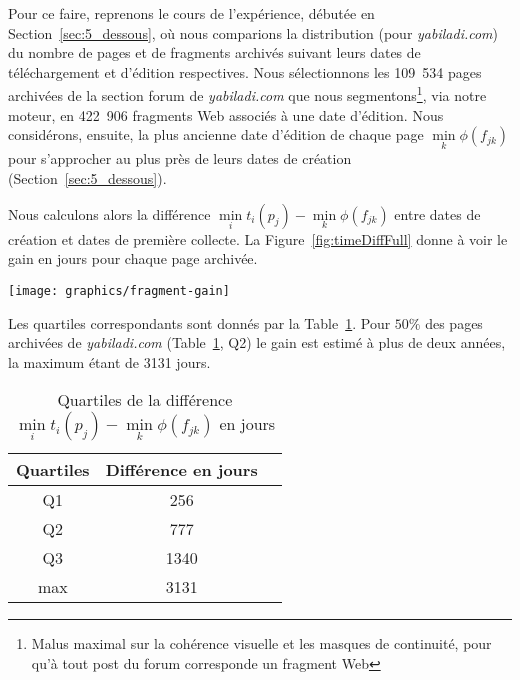 \documentclass[symmetric,justified,marginals=raggedouter]{tufte-book}
\begin{document}
Pour ce faire, reprenons le cours de l'expérience,  débutée en Section~\ref{sec:5_dessous}, où nous comparions la distribution (pour \textit{yabiladi.com}) du nombre de pages et de fragments archivés suivant leurs dates de téléchargement et d'édition respectives. Nous sélectionnons les 109~534 pages archivées de la section forum de \textit{yabiladi.com} que nous segmentons\footnote{\RaggedOuter Malus maximal sur la cohérence visuelle et les masques de continuité, pour qu'à tout post du forum corresponde un fragment Web}, via notre moteur, en 422~906 fragments Web associés à une date d'édition. Nous considérons, ensuite, la plus ancienne date d'édition de chaque page $\min\limits_{k} \phi(f_{jk})$ pour s'approcher au plus près de leurs dates de création (Section~\ref{sec:5_dessous}). 

Nous calculons alors la différence $\min\limits_{i} t_i(p_j) - \min\limits_{k} \phi(f_{jk})$  entre dates de création et dates de première collecte. La Figure~\ref{fig:timeDiffFull} donne à voir le gain en jours pour chaque page archivée. 

\begin{figure*}%
  \texttt{[image: graphics/fragment-gain]}
  \caption{Distribution de la différence $\min\limits_{i} t_i(p_j) - \min\limits_{k} \phi(f_{jk})$ en jours}
  \label{fig:timeDiffFull}
\end{figure*}

\newpage

\noindent Les quartiles correspondants sont donnés par la Table~\ref{tab:quartiles_1}. Pour $50\%$ des pages archivées de \textit{yabiladi.com} (Table~\ref{tab:quartiles_1}, Q2) le gain est estimé à plus de deux années, la maximum étant de 3131 jours.

\begin{table}
\centering
\hspace{2em}%
  \label{tab:quartiles_1}
  \begin{tabular}{ccl}
    \toprule
    Quartiles&Différence en jours\\
    \midrule
    Q1 & 256\\
    Q2 & 777\\
    Q3 & 1340\\    
    max & 3131\\  
  \bottomrule
\end{tabular}
  \bigskip
  \caption{Quartiles de la différence $\min\limits_{i} t_i(p_j) - \min\limits_{k} \phi(f_{jk})$ en jours}
\end{table} 
\end{document}
